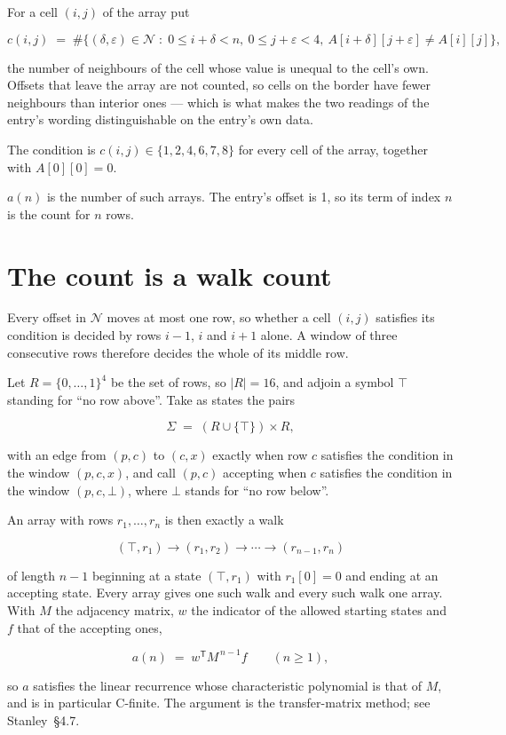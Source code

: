 \documentclass[11pt]{article}
\theoremstyle{definition}
\begin{document}
For a cell $(i,j)$ of the array put

\[c(i,j) \;=\; \#\bigl\{(\delta,\varepsilon)\in\mathcal{N} \;:\; 0\le i+\delta<n,\ 0\le j+\varepsilon<4,\ A[i+\delta][j+\varepsilon] \neq A[i][j]\bigr\},\]

the number of neighbours of the cell whose value is unequal to the cell's own. Offsets that leave the array are not counted, so cells on the border have fewer neighbours than interior ones --- which is what makes the two readings of the entry's wording distinguishable on the entry's own data.

The condition is $c(i,j) \in \{1, 2, 4, 6, 7, 8\}$ for every cell of the array, together with $A[0][0]=0$.

$a(n)$ is the number of such arrays. The entry's offset is 1, so its term of index $n$ is the count for $n$ rows.

\section{The count is a walk count}

Every offset in $\mathcal{N}$ moves at most one row, so whether a cell $(i,j)$ satisfies its condition is decided by rows $i-1$, $i$ and $i+1$ alone. A window of three consecutive rows therefore decides the whole of its middle row.

Let $R = \{0,\dots,1\}^{4}$ be the set of rows, so $|R| = 16$, and adjoin a symbol $\top$ standing for ``no row above''. Take as states the pairs

\[\Sigma \;=\; (R \cup \{\top\}) \times R,\]

with an edge from $(p,c)$ to $(c,x)$ exactly when row $c$ satisfies the condition in the window $(p,c,x)$, and call $(p,c)$ accepting when $c$ satisfies the condition in the window $(p,c,\bot)$, where $\bot$ stands for ``no row below''.

An array with rows $r_1,\dots,r_n$ is then exactly a walk

\[(\top,r_1) \to (r_1,r_2) \to \cdots \to (r_{n-1},r_n)\]

of length $n-1$ beginning at a state $(\top,r_1)$ with $r_1[0]=0$ and ending at an accepting state. Every array gives one such walk and every such walk one array. With $M$ the adjacency matrix, $w$ the indicator of the allowed starting states and $f$ that of the accepting ones,

\[a(n) \;=\; w^{\mathsf T} M^{\,n-1} f \qquad (n \ge 1),\]

so $a$ satisfies the linear recurrence whose characteristic polynomial is that of $M$, and is in particular C-finite. The argument is the transfer-matrix method; see Stanley~\S4.7.
\end{document}
